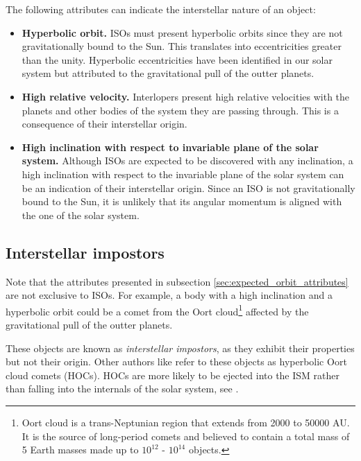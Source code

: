 The following attributes can indicate the interstellar nature of an object:

\begin{itemize}
  \item \textbf{Hyperbolic orbit.} ISOs must present hyperbolic orbits since
        they are not gravitationally bound to the Sun. This translates into
        eccentricities greater than the unity. Hyperbolic eccentricities have
        been identified in our solar system but attributed to the gravitational
        pull of the outter planets.
  \item \textbf{High relative velocity.} Interlopers present high relative
        velocities with the planets and other bodies of the system they are
        passing through. This is a consequence of their interstellar origin.
  \item \textbf{High inclination with respect to invariable plane of the solar
          system.} Although ISOs are expected to be discovered with any
        inclination, a high inclination with respect to the invariable plane of
        the solar system can be an indication of their interstellar origin.
        Since an ISO is not gravitationally bound to the Sun, it is unlikely
        that its angular momentum is aligned with the one of the solar system.
\end{itemize}

\subsection{Interstellar impostors}

Note that the attributes presented in subsection
\ref{sec:expected_orbit_attributes} are not exclusive to ISOs. For example, a
body with a high inclination and a hyperbolic orbit could be a comet from the
Oort cloud\footnote{ Oort cloud is a trans-Neptunian region that extends from
  2000 to 50000 AU. It is the source of long-period comets and believed to contain
  a total mass of 5 Earth masses made up to $10^{12}$ - $10^{14}$ objects. }
affected by the gravitational pull of the outter planets.

These objects are known as \textit{interstellar impostors}, as they exhibit
their properties but not their origin. Other authors like \cite{higuchi2020}
refer to these objects as hyperbolic Oort cloud comets (HOCs). HOCs are more
likely to be ejected into the ISM rather than falling into the internals of the
solar system, see \cite{francis2005}.
